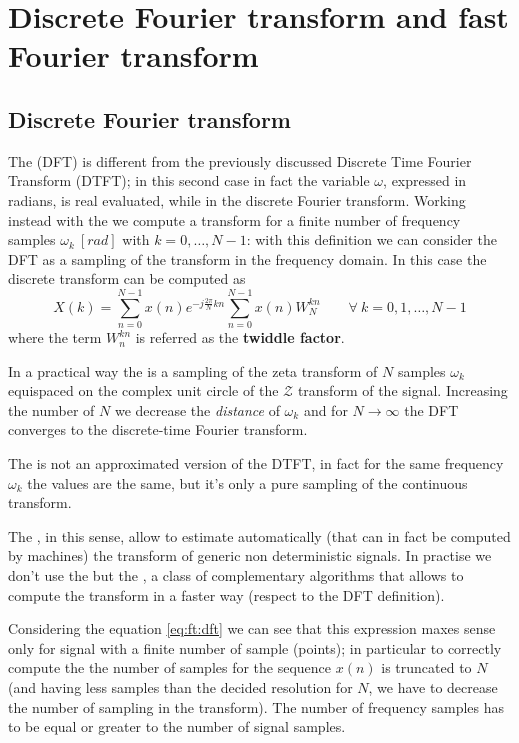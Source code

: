 \chapter{Discrete Fourier transform and fast Fourier transform}
\section{Discrete Fourier transform}
	The  (DFT) is different from the previously discussed Discrete Time Fourier Transform (DTFT); in this second case in fact the variable $\omega$, expressed in radians, is real evaluated, while in the discrete Fourier transform. Working instead with the \dft we compute a transform for a finite number of frequency samples $\omega_k \ [rad]$ with $k=0,\dots, N-1$: with this definition we can consider the DFT as a sampling of the transform in the frequency domain. In this case the discrete transform can be computed as
	\begin{equation} \label{eq:ft:dft}
		X(k) = \sum_{n=0}^{N-1} x(n) e^{-j \frac{2\pi}{N}kn} \sum_{n=0}^{N-1} x(n) W_N^{kn} \qquad \forall \ k = 0,1,\dots, N-1
	\end{equation}
	where the term $W_n^{kn}$ is referred as the \textbf{twiddle factor}.
	
	In a practical way the \dft is a sampling of the zeta transform of $N$ samples $\omega_k$ equispaced on the complex unit circle of the $\mathscr Z$ transform of the signal. Increasing the number of $N$ we decrease the \textit{distance} of $\omega_k$ and for $N\rightarrow\infty$ the DFT converges to the discrete-time Fourier transform.
	
	The \dft is not an approximated version of the DTFT, in fact for the same frequency $\omega_k$ the values are the same, but it's only a pure sampling of the continuous transform. \vspace{3mm}
	
	The \dft, in this sense, allow to estimate automatically (that can in fact be computed by machines) the transform of generic non deterministic signals. In practise we don't use the \dft but the , a class of complementary algorithms that allows to compute the transform in a faster way (respect to the DFT definition). \vspace{3mm}
	
	Considering the equation \ref{eq:ft:dft} we can see that this expression maxes sense only for signal with a finite number of sample (points); in particular to correctly compute the \dft the number of samples for the sequence $x(n)$ is truncated to $N$ (and having less samples than the decided resolution for $N$, we have to decrease the number of sampling in the transform). The number of frequency samples has to be equal or greater to the number of signal samples.
	
